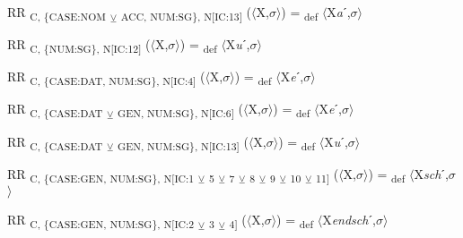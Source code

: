 {\begin{exe}
 RR \textsubscript{C, \{CASE:NOM} \textsubscript{${\veebar}$}\textsubscript{ ACC, NUM:SG\}, N[IC:13]} ($\langle$X,$\sigma $$\rangle$) = \textsubscript{def} $\langle$X\textit{a}ˊ,$\sigma $$\rangle$
\end{exe}

\begin{exe}
 RR \textsubscript{C, \{NUM:SG\}, N[IC:12]} ($\langle$X,$\sigma $$\rangle$) = \textsubscript{def} $\langle$X\textit{u}ˊ,$\sigma $$\rangle$
\end{exe}

\begin{exe}
 RR \textsubscript{C, \{CASE:DAT, NUM:SG\}, N[IC:4]} ($\langle$X,$\sigma $$\rangle$) = \textsubscript{def} $\langle$X\textit{e}ˊ,$\sigma $$\rangle$
\end{exe}

\begin{exe}
 RR \textsubscript{C, \{CASE:DAT} \textsubscript{${\veebar}$}\textsubscript{ GEN, NUM:SG\}, N[IC:6]} ($\langle$X,$\sigma $$\rangle$) = \textsubscript{def} $\langle$X\textit{e}ˊ,$\sigma $$\rangle$
\end{exe}

\begin{exe}
 RR \textsubscript{C, \{CASE:DAT} \textsubscript{${\veebar}$}\textsubscript{ GEN, NUM:SG\}, N[IC:13]} ($\langle$X,$\sigma $$\rangle$) = \textsubscript{def} $\langle$X\textit{u}ˊ,$\sigma $$\rangle$
\end{exe}

\begin{exe}
 RR \textsubscript{C, \{CASE:GEN, NUM:SG\}, N[IC:1} \textsubscript{${\veebar}$}\textsubscript{ 5} \textsubscript{${\veebar}$}\textsubscript{ 7} \textsubscript{${\veebar}$}\textsubscript{ 8} \textsubscript{${\veebar}$}\textsubscript{ 9} \textsubscript{${\veebar}$}\textsubscript{ 10} \textsubscript{${\veebar}$}\textsubscript{ 11]} ($\langle$X,$\sigma $$\rangle$) = \textsubscript{def} $\langle$X\textit{sch}ˊ,$\sigma $$\rangle$
\end{exe}

\begin{exe}
 RR \textsubscript{C, \{CASE:GEN, NUM:SG\}, N[IC:2} \textsubscript{${\veebar}$}\textsubscript{ 3} \textsubscript{${\veebar}$}\textsubscript{ 4]} ($\langle$X,$\sigma $$\rangle$) = \textsubscript{def} $\langle$X\textit{endsch}ˊ,$\sigma $$\rangle$
\end{exe}

}
